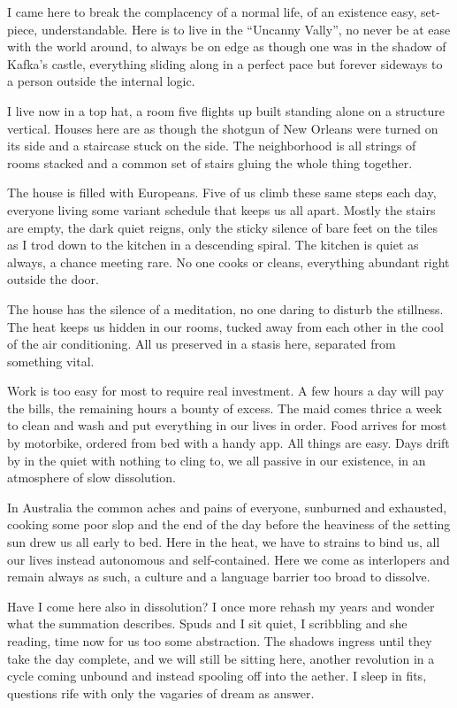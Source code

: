 \documentclass[ebook, 10pt, openright, onecolumn]{memoir}
\begin{document}
I came here to break the complacency of a normal life, of an existence easy,
set-piece, understandable.  Here is to live in the ``Uncanny Vally'', no never
be at ease with the world around, to always be on edge as though one was in the
shadow of Kafka's castle, everything sliding along in a perfect pace but forever
sideways to a person outside the internal logic.

I live now in a top hat, a room five flights up built standing alone on a
structure vertical.  Houses here are as though the shotgun of New Orleans were
turned on its side and a staircase stuck on the side.  The neighborhood is all
strings of rooms stacked and a common set of stairs gluing the whole thing
together.

The house is filled with Europeans.  Five of us climb these same steps each
day, everyone living some variant schedule that keeps us all apart.  Mostly the
stairs are empty, the dark quiet reigns, only the sticky silence of bare feet
on the tiles as I trod down to the kitchen in a descending spiral.  The kitchen
is quiet as always, a chance meeting rare.  No one cooks or cleans, everything
abundant right outside the door.

The house has the silence of a meditation, no one daring to disturb the
stillness.  The heat keeps us hidden in our rooms, tucked away from each other
in the cool of the air conditioning. All us preserved in a stasis here,
separated from something vital.

Work is too easy for most to require real investment.  A few hours a day will
pay the bills, the remaining hours a bounty of excess.  The maid comes thrice a
week to clean and wash and put everything in our lives in order.  Food arrives
for most by motorbike, ordered from bed with a handy app.  All things are easy.
Days drift by in the quiet with nothing to cling to, we all passive in our
existence, in an atmosphere of slow dissolution.

In Australia the common aches and pains of everyone, sunburned and exhausted,
cooking some poor slop and the end of the day before the heaviness of the
setting sun drew us all early to bed.  Here in the heat, we have to strains to
bind us, all our lives instead autonomous and self-contained.  Here we come as
interlopers and remain always as such, a culture and a language barrier too
broad to dissolve.

Have I come here also in dissolution?  I once more rehash my years and wonder
what the summation describes.  Spuds and I sit quiet, I scribbling and she
reading, time now for us too some abstraction.  The shadows ingress until they
take the day complete, and we will still be sitting here, another revolution in
a cycle coming unbound and instead spooling off into the aether.  I sleep in
fits, questions rife with only the vagaries of dream as answer.
\end{document}
